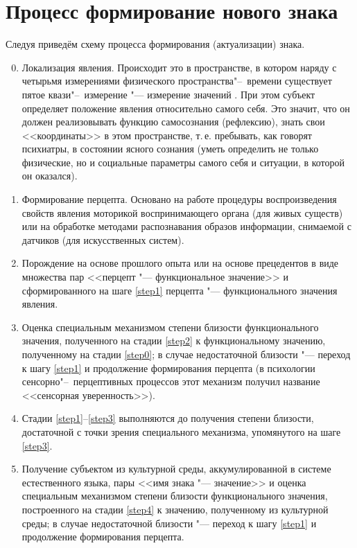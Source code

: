 \section{Процесс формирование нового знака} \label{sect2_2}

Следуя \cite{PanovA2014a} приведём схему процесса формирования (актуализации) знака.
\begin{enumerate}
	\setcounter{enumi}{-1}
	\renewcommand\labelenumi{\theenumi.}
	\item\label{step0} Локализация явления. Происходит это в пространстве, в котором наряду с четырьмя измерениями физического пространства"--~времени существует пятое квази"--~измерение "--- измерение значений \cite{Leontiev1983}. При этом субъект определяет положение явления относительно самого себя. Это значит, что он должен реализовывать функцию самосознания (рефлексию), знать свои <<координаты>> в этом пространстве, т.\,е. пребывать, как говорят психиатры, в состоянии ясного сознания (уметь определить не только физические, но и социальные параметры самого себя и ситуации, в которой он оказался).
	\item\label{step1} Формирование перцепта. Основано на работе процедуры воспроизведения свойств явления моторикой воспринимающего органа (для живых существ) или на обработке методами распознавания образов информации, снимаемой с датчиков (для искусственных систем).
	\item\label{step2} Порождение на основе прошлого опыта или на основе прецедентов в виде множества пар <<перцепт "--- функциональное значение>> и сформированного на шаге \ref{step1} перцепта "--- функционального значения явления.
	\item\label{step3} Оценка специальным механизмом степени близости функционального значения, полученного на стадии \ref{step2} к функциональному значению, полученному на стадии \ref{step0}; в случае недостаточной близости "--- переход к шагу \ref{step1} и продолжение формирования перцепта (в психологии сенсорно"--~перцептивных процессов этот механизм получил название <<сенсорная уверенность>>).
	\item\label{step4} Стадии \ref{step1}--\ref{step3} выполняются до получения степени близости, достаточной с точки зрения специального механизма, упомянутого на шаге \ref{step3}.
	\item\label{step5} Получение субъектом из культурной среды, аккумулированной в системе естественного языка, пары <<имя знака "--- значение>> и оценка специальным механизмом степени близости функционального значения, построенного на стадии \ref{step4} к значению, полученному из культурной среды; в случае недостаточной близости "--- переход к шагу \ref{step1} и продолжение формирования перцепта.

\end{enumerate}
